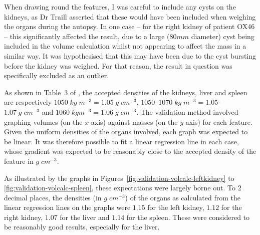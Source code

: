When drawing round the features, I was careful to include any cysts on the kidneys, as Dr Traill asserted that these would have been included when weighing the organs during the autopsy. In one case -- for the right kidney of patient OX46 -- this significantly affected the result, due to a large ($80\mathit{mm}$ diameter) cyst being included in the volume calculation whilst not appearing to affect the mass in a similar way. It was hypothesised that this may have been due to the cyst bursting before the kidney was weighed. For that reason, the result in question was specifically excluded as an outlier.

As shown in Table~$3$ of \cite{woodard86}, the accepted densities of the kidneys, liver and spleen are respectively $1050 \; \mathit{kg} \; m^{-3} = 1.05 \; g \; \mathit{cm}^{-3}$, $1050$--$1070 \; \mathit{kg} \; m^{-3} = 1.05$--$1.07 \; g \; \mathit{cm}^{-3}$ and $1060 \; \mathit{kg} m^{-3} = 1.06 \; g \; \mathit{cm}^{-3}$. The validation method involved graphing volumes (on the $x$ axis) against masses (on the $y$ axis) for each feature. Given the uniform densities of the organs involved, each graph was expected to be linear. It was therefore possible to fit a linear regression line in each case, whose gradient was expected to be reasonably close to the accepted density of the feature in $g \; \mathit{cm}^{-3}$.

As illustrated by the graphs in Figures~\ref{fig:validation-volcalc-leftkidney} to \ref{fig:validation-volcalc-spleen}, these expectations were largely borne out. To $2$ decimal places, the densities (in $g \; \mathit{cm}^{-3}$) of the organs as calculated from the linear regression lines on the graphs were $1.15$ for the left kidney, $1.12$ for the right kidney, $1.07$ for the liver and $1.14$ for the spleen. These were considered to be reasonably good results, especially for the liver.

